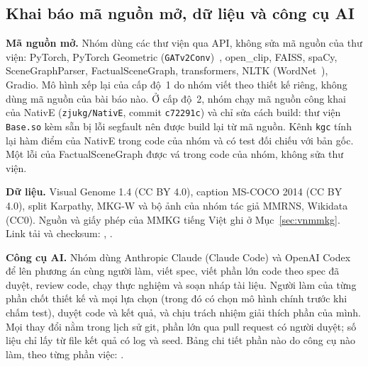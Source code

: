 \subsection{Khai báo mã nguồn mở, dữ liệu và công cụ AI}

\textbf{Mã nguồn mở.} Nhóm dùng các thư viện qua API, không sửa mã nguồn của thư viện: PyTorch, PyTorch Geometric
(\texttt{GATv2Conv})~\cite{fey2019pyg}, open\_clip, FAISS, spaCy, SceneGraphParser, FactualSceneGraph, transformers, NLTK
(WordNet~\cite{miller1995wordnet}), Gradio. Mô hình xếp lại của cấp độ~1 do nhóm viết theo thiết kế riêng, không dùng mã
nguồn của bài báo nào. Ở cấp độ~2, nhóm chạy mã nguồn công khai của NativE (\texttt{zjukg/NativE}, commit \texttt{c72291c})
và chỉ sửa cách build: thư viện \texttt{Base.so} kèm sẵn bị lỗi segfault nên được build lại từ mã nguồn. Kênh \texttt{kgc}
tính lại hàm điểm của NativE trong code của nhóm và có test đối chiếu với bản gốc. Một lỗi của FactualSceneGraph được vá
trong code của nhóm, không sửa thư viện.

\textbf{Dữ liệu.} Visual Genome 1.4 (CC BY 4.0), caption MS-COCO 2014 (CC BY 4.0), split Karpathy, MKG-W và bộ ảnh của nhóm
tác giả MMRNS, Wikidata (CC0). Nguồn và giấy phép của MMKG tiếng Việt ghi ở Mục~\ref{sec:vnmmkg}. Link tải và checksum:
, .

\textbf{Công cụ AI.} Nhóm dùng Anthropic Claude (Claude Code) và OpenAI Codex để lên phương án cùng người làm, viết spec,
viết phần lớn code theo spec đã duyệt, review code, chạy thực nghiệm và soạn nháp tài liệu. Người làm của từng phần chốt
thiết kế và mọi lựa chọn (trong đó có chọn mô hình chính trước khi chấm test), duyệt code và kết quả, và chịu trách nhiệm
giải thích phần của mình. Mọi thay đổi nằm trong lịch sử git, phần lớn qua pull request có người duyệt; số liệu chỉ lấy từ
file kết quả có log và seed. Bảng chi tiết phần nào do công cụ nào làm, theo từng phần việc: .
